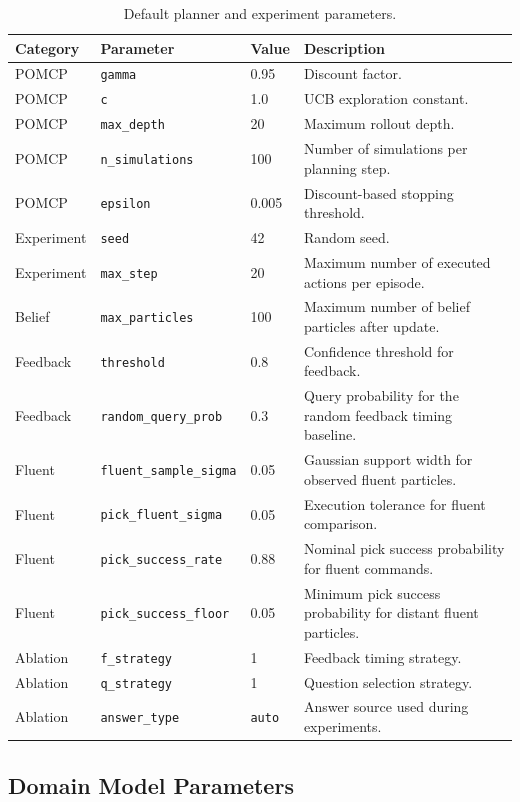 \begin{table}[H]
\centering
\small
\caption{Default planner and experiment parameters.}
\label{tab:planner_params}
\begin{tabularx}{\linewidth}{lllX}
\toprule
Category & Parameter & Value & Description \\
\midrule
POMCP & \texttt{gamma} & 0.95 & Discount factor. \\
POMCP & \texttt{c} & 1.0 & UCB exploration constant. \\
POMCP & \texttt{max\_depth} & 20 & Maximum rollout depth. \\
POMCP & \texttt{n\_simulations} & 100 & Number of simulations per planning step. \\
POMCP & \texttt{epsilon} & 0.005 & Discount-based stopping threshold. \\
Experiment & \texttt{seed} & 42 & Random seed. \\
Experiment & \texttt{max\_step} & 20 & Maximum number of executed actions per episode. \\
Belief & \texttt{max\_particles} & 100 & Maximum number of belief particles after update. \\
Feedback & \texttt{threshold} & 0.8 & Confidence threshold for feedback. \\
Feedback & \texttt{random\_query\_prob} & 0.3 & Query probability for the random feedback timing baseline. \\
Fluent & \texttt{fluent\_sample\_sigma} & 0.05 & Gaussian support width for observed fluent particles. \\
Fluent & \texttt{pick\_fluent\_sigma} & 0.05 & Execution tolerance for fluent comparison. \\
Fluent & \texttt{pick\_success\_rate} & 0.88 & Nominal pick success probability for fluent commands. \\
Fluent & \texttt{pick\_success\_floor} & 0.05 & Minimum pick success probability for distant fluent particles. \\
Ablation & \texttt{f\_strategy} & 1 & Feedback timing strategy. \\
Ablation & \texttt{q\_strategy} & 1 & Question selection strategy. \\
Ablation & \texttt{answer\_type} & \texttt{auto} & Answer source used during experiments. \\
\bottomrule
\end{tabularx}
\end{table}

\subsection{Domain Model Parameters}~\label{app:model_params}

